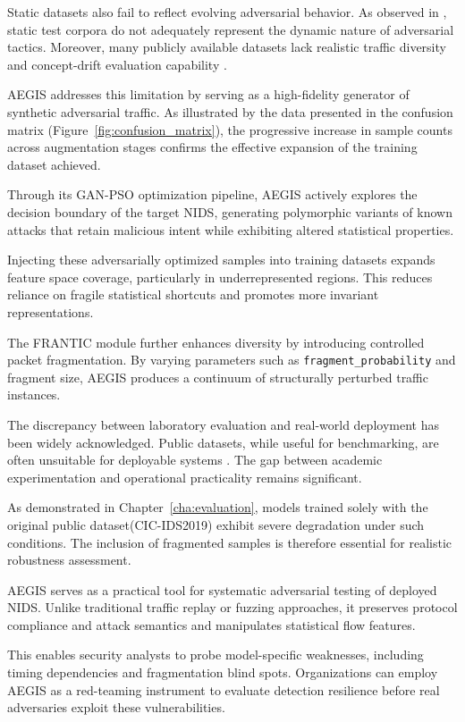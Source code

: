 Static datasets also fail to reflect evolving adversarial behavior. As observed in \cite{roshan2024boosting}, static test corpora do not adequately represent the dynamic nature of adversarial tactics. Moreover, many publicly available datasets lack realistic traffic diversity and concept-drift evaluation capability \cite{alotaibi2023adversarial}.

AEGIS addresses this limitation by serving as a high-fidelity generator of synthetic adversarial traffic. As illustrated by the data presented in the confusion matrix (Figure~\ref{fig:confusion_matrix}), the progressive increase in sample counts across augmentation stages confirms the effective expansion of the training dataset achieved.

Through its GAN-PSO optimization pipeline, AEGIS actively explores the decision boundary of the target NIDS, generating polymorphic variants of known attacks that retain malicious intent while exhibiting altered statistical properties.

Injecting these adversarially optimized samples into training datasets expands feature space coverage, particularly in underrepresented regions. This reduces reliance on fragile statistical shortcuts and promotes more invariant representations.


The FRANTIC module further enhances diversity by introducing controlled packet fragmentation. By varying parameters such as \texttt{fragment\_probability} and fragment size, AEGIS produces a continuum of structurally perturbed traffic instances.

The discrepancy between laboratory evaluation and real-world deployment has been widely acknowledged. Public datasets, while useful for benchmarking, are often unsuitable for deployable systems \cite{neupane2022explainable}. The gap between academic experimentation and operational practicality remains significant.

As demonstrated in Chapter~\ref{cha:evaluation}, models trained solely with the original public dataset(CIC-IDS2019) exhibit severe degradation under such conditions. The inclusion of fragmented samples is therefore essential for realistic robustness assessment.

AEGIS serves as a practical tool for systematic adversarial testing of deployed NIDS.
Unlike traditional traffic replay or fuzzing approaches, it preserves protocol compliance and attack semantics and manipulates statistical flow features.

This enables security analysts to probe model-specific weaknesses, including timing dependencies and fragmentation blind spots.
Organizations can employ AEGIS as a red-teaming instrument to evaluate detection resilience before real adversaries exploit these vulnerabilities.

